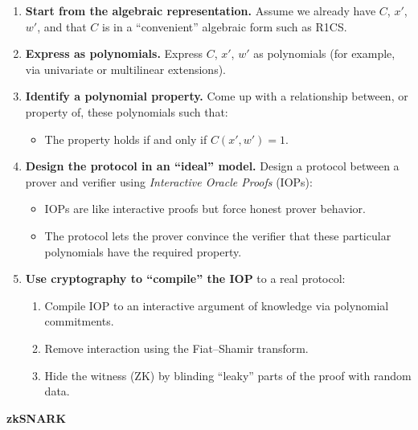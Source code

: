 \documentclass[11pt]{article}
\theoremstyle{plain}
\theoremstyle{definition}
\begin{document}
\begin{enumerate}
  \item \textbf{Start from the algebraic representation.} Assume we already have $C$, $x'$, $w'$,
        and that $C$ is in a ``convenient'' algebraic form such as R1CS.

  \item \textbf{Express as polynomials.} Express $C$, $x'$, $w'$ as polynomials (for example, via
        univariate or multilinear extensions).

  \item \textbf{Identify a polynomial property.} Come up with a relationship between, or property of,
        these polynomials such that:
        \begin{itemize}
          \item The property holds if and only if $C(x', w') = 1$.
        \end{itemize}

  \item \textbf{Design the protocol in an ``ideal'' model.} Design a protocol between a prover and
        verifier using \emph{Interactive Oracle Proofs} (IOPs):
        \begin{itemize}
          \item IOPs are like interactive proofs but force honest prover behavior.
          \item The protocol lets the prover convince the verifier that these particular polynomials
                have the required property.
        \end{itemize}

  \item \textbf{Use cryptography to ``compile'' the IOP} to a real protocol:
        \begin{enumerate}
          \item Compile IOP to an interactive argument of knowledge via polynomial commitments.
          \item Remove interaction using the Fiat--Shamir transform.
          \item Hide the witness (ZK) by blinding ``leaky'' parts of the proof with random data.
        \end{enumerate}
\end{enumerate}

\begin{tcolorbox}[colback=gray!10, colframe=gray!60, title={Handwritten annotation: result of this pipeline}]
  \centerline{\textbf{zkSNARK}}
\end{tcolorbox}
\end{document}
